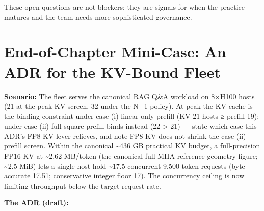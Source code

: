 These open questions are not blockers; they are signals for when the
practice matures and the team needs more sophisticated governance.

\section{End-of-Chapter Mini-Case: An ADR for the KV-Bound
Fleet}\label{end-of-chapter-mini-case-an-adr-for-the-kv-bound-fleet}

\textbf{Scenario:} The fleet serves the canonical RAG Q\&A workload on
8×H100 hosts (21 at the peak KV screen, 32 under the N−1 policy). At
peak the KV cache is the binding constraint under case (i) linear-only
prefill (KV 21 hosts ≥ prefill 19); under case (ii) full-square prefill
binds instead (22 \textgreater{} 21) --- state which case this ADR's
FP8-KV lever relieves, and note FP8 KV does not shrink the case (ii)
prefill screen. Within the canonical \textasciitilde436 GB practical KV
budget, a full-precision FP16 KV at \textasciitilde2.62 MB/token (the
canonical full-MHA reference-geometry figure; \textasciitilde2.5 MiB)
lets a single host hold \textasciitilde17.5 concurrent 9,500-token
requests (byte-accurate 17.51; conservative integer floor 17). The
concurrency ceiling is now limiting throughput below the target request
rate.

\textbf{The ADR (draft):}

